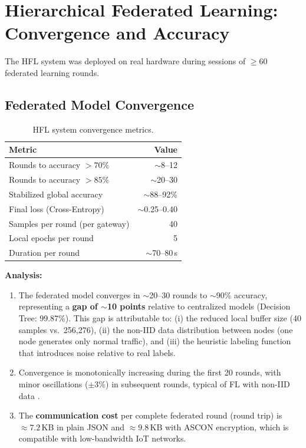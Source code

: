 \section{Hierarchical Federated Learning: Convergence and Accuracy}
\label{sec:res_hfl}

The HFL system was deployed on real hardware during sessions of $\geq 60$ federated learning rounds.

\subsection{Federated Model Convergence}

\begin{table}[H]
\centering
\caption{HFL system convergence metrics.}
\label{tab:hfl_convergence}
\begin{tabular}{l r}
\toprule
\textbf{Metric} & \textbf{Value} \\
\midrule
Rounds to accuracy $> 70\%$  & $\sim$8--12 \\
Rounds to accuracy $> 85\%$  & $\sim$20--30 \\
Stabilized global accuracy    & $\sim$88--92\% \\
Final loss (Cross-Entropy)    & $\sim$0.25--0.40 \\
Samples per round (per gateway) & 40 \\
Local epochs per round        & 5 \\
Duration per round            & $\sim$70--80\,s \\
\bottomrule
\end{tabular}
\end{table}

\textbf{Analysis:}
\begin{enumerate}
    \item The federated model converges in $\sim$20--30 rounds to $\sim$90\% accuracy, representing a \textbf{gap of $\sim$10 points} relative to centralized models (Decision Tree: 99.87\%). This gap is attributable to: (i) the reduced local buffer size (40 samples vs.\ 256,276), (ii) the non-IID data distribution between nodes (one node generates only normal traffic), and (iii) the heuristic labeling function that introduces noise relative to real labels.

    \item Convergence is monotonically increasing during the first 20 rounds, with minor oscillations ($\pm 3\%$) in subsequent rounds, typical of FL with non-IID data \cite{Imteaj2022_FL_ResourceConstrainedSurvey}.

    \item The \textbf{communication cost} per complete federated round (round trip) is $\approx 7.2$\,KB in plain JSON and $\approx 9.8$\,KB with ASCON encryption, which is compatible with low-bandwidth IoT networks.
\end{enumerate}

